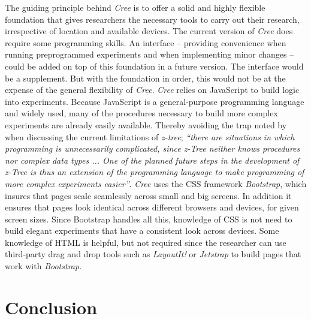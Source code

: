 \documentclass[preprint, 12pt]{elsarticle}
\newcommand{\Cree}{\emph{Cree}\xspace}
\begin{document}
The guiding principle behind \Cree is to offer a solid and highly flexible foundation that gives researchers the necessary tools to carry out their research, irrespective of location and available devices. The current version of \Cree does require some programming skills. An interface -- providing convenience when running preprogrammed experiments and when implementing minor changes -- could be added on top of this foundation in a future version. The interface would be a supplement. But with the foundation in order, this would not be at the expense of the general flexibility of \Cree. \Cree relies on JavaScript to build logic into experiments. Because JavaScript is a general-purpose programming language and widely used, many of the procedures necessary to build more complex experiments are already easily available. Thereby avoiding the trap noted by \citet[p. 177]{Fischbacher_2007} when discussing the current limitations of \emph{z-tree}; \emph{``there are situations in which programming is unnecessarily complicated, since z-Tree neither knows procedures nor complex data types ... One of the planned future steps in the development of z-Tree is thus an extension of the programming language to make programming of more complex experiments easier''}. \Cree uses the CSS framework \emph{Bootstrap}, which insures that pages scale seamlessly across small and big screens. In addition it ensures that pages look identical across different browsers and devices, for given screen sizes. Since Bootstrap handles all this, knowledge of CSS is not need to build elegant experiments that have a consistent look across devices. Some knowledge of HTML is  helpful, but not required since the researcher can use third-party drag and drop tools such as \emph{LayoutIt!} or \emph{Jetstrap} to build pages that work with \emph{Bootstrap}\footnotemark[8].



\section{Conclusion}
\label{S:Conclusion}
\end{document}
